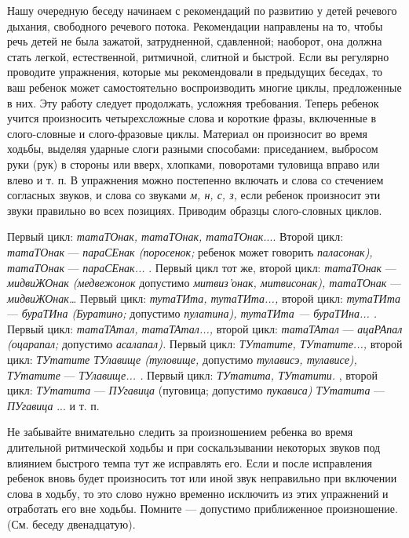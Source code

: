 \documentclass[a5paper]{book}
\renewcommand{\emph}[1]{\textit{#1}}
\begin{document}
Нашу очередную беседу начинаем с рекомендаций по развитию у детей
речевого дыхания, свободного речевого потока. Рекомендации направлены на
то, чтобы речь детей не была зажатой, затрудненной, сдавленной;
наоборот, она должна стать легкой, естественной, ритмичной, слитной и
быстрой. Если вы регулярно проводите упражнения, которые мы
рекомендовали в предыдущих беседах, то ваш ребенок может самостоятельно
воспроизводить многие циклы, предложенные в них. Эту работу следует
продолжать, усложняя требования. Теперь ребенок учится произносить
четырехсложные слова и короткие фразы, включенные в слого-словные и
слого-фразовые циклы. Материал он произносит во время ходьбы, выделяя
ударные слоги разными способами: приседанием, выбросом руки (рук) в
стороны или вверх, хлопками, поворотами туловища вправо или влево и т.
п. В упражнения можно постепенно включать и слова со стечением согласных
звуков, и слова со звуками \emph{м, н, с, з,} если ребенок произносит
эти звуки правильно во всех позициях. Приводим образцы слого-словных
циклов.

Первый цикл: \emph{татаТОнак, татаТОнак, татаТОнак.}... Второй цикл:
\emph{татаТОнак} --- \emph{параСЕнак (поросенок;} ребенок может говорить
\emph{паласонак), татаТОнак} --- \emph{параСЕнак...} . Первый цикл тот
же, второй цикл: \emph{татаТОнак} --- \emph{мидвиЖОнак (медвежонок}
допустимо \emph{митвиз'онак, митвисонак), татаТОнак} ---
\emph{мидвиЖОнак\ldots{}} Первый цикл: \emph{тутаТИта, тутаТИта...,}
второй цикл: \emph{тутаТИта}--- \emph{бураТИна (Буратино;} допустимо
\emph{пулатина), тутаТИта --- бураТИна... .} Первый цикл:
\emph{татаТАтал, татаТАтал...,} второй цикл: \emph{татаТАтал} ---
\emph{ацаРАпал (оцарапал;} допустимо \emph{асалапал).} Первый цикл:
\emph{ТУтатите, ТУтатите...,} второй цикл: \emph{ТУтатите ТУлавище
(туловище,} допустимо \emph{тулависэ, тулависе), ТУтатите} ---
\emph{ТУлавище... .} Первый цикл: \emph{ТУтатита, ТУтатити.} , второй
цикл: \emph{ТУтатита} --- \emph{ПУгавица} (пуговица; допустимо
\emph{пукависа) ТУтатита} --- \emph{ПУгавица} ... и т. п.

Не забывайте внимательно следить за произношением ребенка во время
длительной ритмической ходьбы и при соскальзывании некоторых звуков под
влиянием быстрого темпа тут же исправлять его. Если и после исправления
ребенок вновь будет произносить тот или иной звук неправильно при
включении слова в ходьбу, то это слово нужно временно исключить из этих
упражнений и отработать его вне ходьбы. Помните --- допустимо
приближенное произношение. (См. беседу двенадцатую).
\end{document}
